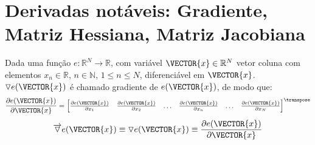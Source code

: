 
\section{Derivadas notáveis: Gradiente, Matriz Hessiana, Matriz Jacobiana}

\begin{proposition}\label{def:gradient}
 Dada uma função $e:\mathbb{R}^{N}\rightarrow \mathbb{R}$, com variável $\VECTOR{x} \in \mathbb{R}^{N}$
 vetor coluna com elementos $x_n\in \mathbb{R}$, $n\in \mathbb{N}$, $1 \leq n \leq N$,
 diferenciável em $\VECTOR{x}$. 
 $\triangledown e(\VECTOR{x})$ é chamado gradiente 
\cite[pp. 913]{stewart2008calculus} \cite[pp. 80]{telles2015matematica} \cite{Gradient}  de $e(\VECTOR{x})$, de modo que: 
\begin{equation}
\frac{\partial e(\VECTOR{x})}{\partial \VECTOR{x} }=
\left[
\begin{matrix}
\frac{\partial e(\VECTOR{x}) }{\partial x_{1}}&
\frac{\partial e(\VECTOR{x}) }{\partial x_{2}}&
\hdots&
\frac{\partial e(\VECTOR{x}) }{\partial x_{n}}&
\hdots&
\frac{\partial e(\VECTOR{x}) }{\partial x_{N}}
\end{matrix}
\right]^{\transpose}
 \end{equation}
\begin{equation}
\overrightarrow{\triangledown} e(\VECTOR{x})\equiv  
\triangledown e(\VECTOR{x}) \equiv 
\frac{\partial e(\VECTOR{x})}{\partial \VECTOR{x} }
\end{equation}
\end{proposition}


